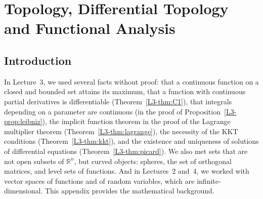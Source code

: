 \chapter{Topology, Differential Topology and Functional Analysis}\label{A-chapter}
\begingroup
\section*{Introduction}

In Lecture~3, we used several facts without proof: that a continuous function on a closed and bounded set attains its maximum, that a function with continuous partial derivatives is differentiable (Theorem~\ref{L3-thm:C1}), that integrals depending on a parameter are continuous (in the proof of Proposition~\ref{L3-prop:leibniz}), the implicit function theorem in the proof of the Lagrange multiplier theorem (Theorem~\ref{L3-thm:lagrange}), the necessity of the KKT conditions (Theorem~\ref{L3-thm:kkt}), and the existence and uniqueness of solutions of differential equations (Theorem~\ref{L3-thm:picard}). We also met sets that are not open subsets of $\mathbb{R}^n$, but curved objects: spheres, the set of orthogonal matrices, and level sets of functions. And in Lectures~2 and~4, we worked with vector spaces of functions and of random variables, which are infinite-dimensional. This appendix provides the mathematical background.
